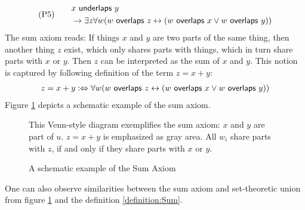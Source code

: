 \begin{align}
&\text{(P5)}
\quad
&\begin{split}
&x ~\textsf{underlaps}~ y 
\\&\rightarrow
\exists z \forall w (w ~\textsf{overlaps}~ z \leftrightarrow (w ~\textsf{overlaps}~ x \vee w ~\textsf{overlaps}~ y))
\end{split}
\label{axiom:Sum}
\end{align}
The sum axiom reads:
If things $x$ and $y$ are two parts of the same thing, then another thing $z$ exist, which only shares parts with things, which in turn share parts with $x$ or $y$.
Then $z$ can be interpreted as the sum of $x$ and $y$.
This notion is captured by following definition of the term $z = x + y$:
\begin{align}
z = x + y
:\Leftrightarrow
\forall w (w ~\textsf{overlaps}~ z \leftrightarrow (w ~\textsf{overlaps}~ x \vee w ~\textsf{overlaps}~ y))
\label{definition:Sum}
\end{align}
Figure \ref{figure:SumAxiomExample} depicts a schematic example of the sum axiom.
\begin{figure}[h!]
\begin{center}
\end{center}
{
\scriptsize 
This Venn-style diagram exemplifies the sum axiom:
$x$ and $y$ are part of $u$.
$z = x + y$ is emphasized as gray area.
All $w_i$ share parts with $z$, if and only if they share parts with $x$ or $y$.
}
\caption{A schematic example of the Sum Axiom}
\label{figure:SumAxiomExample}
\end{figure}

One can also observe similarities between the sum axiom and set-theoretic union from figure \ref{figure:SumAxiomExample} and the definition \ref{definition:Sum}.

